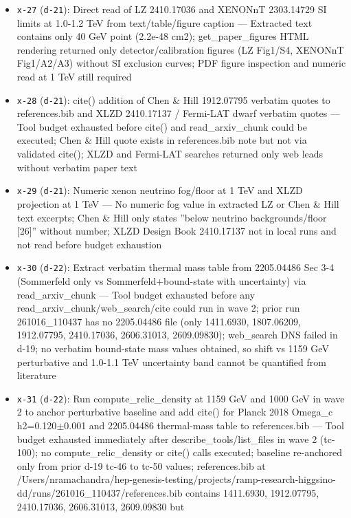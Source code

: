 \documentclass[11pt,a4paper]{article}
\begin{document}
\begin{itemize}
  \item \texttt{x-27} (\texttt{d-21}): Direct read of LZ 2410.17036 and XENONnT 2303.14729 SI limits at 1.0-1.2 TeV from text/table/figure caption --- Extracted text contains only 40 GeV point (2.2e-48 cm2); get\_paper\_figures HTML rendering returned only detector/calibration figures (LZ Fig1/S4, XENONnT Fig1/A2/A3) without SI exclusion curves; PDF figure inspection and numeric read at 1 TeV still required
  \item \texttt{x-28} (\texttt{d-21}): cite() addition of Chen \& Hill 1912.07795 verbatim quotes to references.bib and XLZD 2410.17137 / Fermi-LAT dwarf verbatim quotes --- Tool budget exhausted before cite() and read\_arxiv\_chunk could be executed; Chen \& Hill quote exists in references.bib note but not via validated cite(); XLZD and Fermi-LAT searches returned only web leads without verbatim paper text
  \item \texttt{x-29} (\texttt{d-21}): Numeric xenon neutrino fog/floor at 1 TeV and XLZD projection at 1 TeV --- No numeric fog value in extracted LZ or Chen \& Hill text excerpts; Chen \& Hill only states ''below neutrino backgrounds/floor [26]'' without number; XLZD Design Book 2410.17137 not in local runs and not read before budget exhaustion
  \item \texttt{x-30} (\texttt{d-22}): Extract verbatim thermal mass table from 2205.04486 Sec 3-4 (Sommerfeld only vs Sommerfeld+bound-state with uncertainty) via read\_arxiv\_chunk --- Tool budget exhausted before any read\_arxiv\_chunk/web\_search/cite could run in wave 2; prior run 261016\_110437 has no 2205.04486 file (only 1411.6930, 1807.06209, 1912.07795, 2410.17036, 2606.31013, 2609.09830); web\_search DNS failed in d-19; no verbatim bound-state mass values obtained, so shift vs 1159 GeV perturbative and 1.0-1.1 TeV uncertainty band cannot be quantified from literature
  \item \texttt{x-31} (\texttt{d-22}): Run compute\_relic\_density at 1159 GeV and 1000 GeV in wave 2 to anchor perturbative baseline and add cite() for Planck 2018 Omega\_c h2=0.120$\pm$0.001 and 2205.04486 thermal-mass table to references.bib --- Tool budget exhausted immediately after describe\_tools/list\_files in wave 2 (tc-100); no compute\_relic\_density or cite() calls executed; baseline re-anchored only from prior d-19 tc-46 to tc-50 values; references.bib at /Users/nramachandra/hep-genesis-testing/projects/ramp-research-higgsino-dd/runs/261016\_110437/references.bib contains 1411.6930, 1912.07795, 2410.17036, 2606.31013, 2609.09830 but 
\end{itemize}
\end{document}
